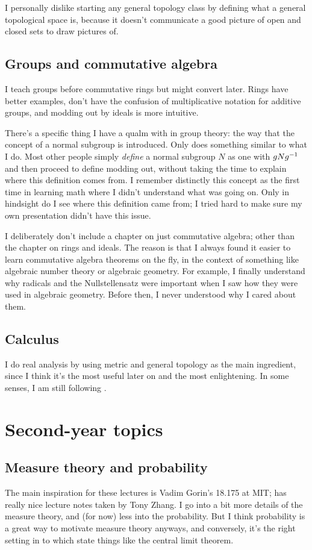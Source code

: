 I personally dislike starting any general topology class
by defining what a general topological space is,
because it doesn't communicate a good picture of open and closed sets
to draw pictures of.

\subsection{Groups and commutative algebra}
I teach groups before commutative rings but might convert later.
Rings have better examples, don't have the confusion of multiplicative
notation for additive groups, and modding out by ideals is more intuitive.

There's a specific thing I have a qualm with in group theory:
the way that the concept of a normal subgroup is introduced.
Only \cite{ref:gowers} does something similar to what I do.
Most other people simply \emph{define} a normal subgroup $N$
as one with $gNg^{-1}$ and then proceed to define modding out,
without taking the time to explain where this definition comes from.
I remember distinctly this concept as the first time in learning math
where I didn't understand what was going on.
Only in hindsight do I see where this definition came from;
I tried hard to make sure my own presentation didn't have this issue.

I deliberately don't include a chapter on just commutative algebra;
other than the chapter on rings and ideals.
The reason is that I always found it easier to learn
commutative algebra theorems on the fly,
in the context of something like algebraic number theory or algebraic geometry.
For example, I finally understand why radicals and the Nullstellensatz were important
when I saw how they were used in algebraic geometry.
Before then, I never understood why I cared about them.

\subsection{Calculus}
I do real analysis by using metric and general topology
as the main ingredient, since I think it's the most useful
later on and the most enlightening.
In some senses, I am still following \cite{ref:pugh}.

\section{Second-year topics}
\subsection{Measure theory and probability}
The main inspiration for these lectures is
Vadim Gorin's 18.175 at MIT;
\cite{ref:gorin} has really nice lecture notes taken by Tony Zhang.
I go into a bit more details of the measure theory,
and (for now) less into the probability.
But I think probability is a great way to motivate measure theory anyways,
and conversely, it's the right setting in to which state things like
the central limit theorem.

